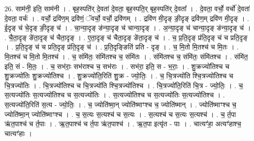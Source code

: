 \documentclass[17pt]{extarticle}
\begin{document}
26. साम॑नी॒ इति॒ साम॑नी । . बृह॒स्पति॑र् दे॒वता॑ दे॒वता॒ बृह॒स्पति॒र् बृह॒स्पति॑र् दे॒वता᳚ । . दे॒वता॒ वर्चो॒ वर्चो॑ दे॒वता॑ दे॒वता॒ वर्चः॑ । . वर्चो॒ द्रवि॑ण॒म् द्रवि॑णं॒ ॅवर्चो॒ वर्चो॒ द्रवि॑णम् । . द्रवि॑ण मी॒दृङ् ङी॒दृङ् द्रवि॑ण॒म् द्रवि॑ण मी॒दृङ् । . ई॒दृङ् च॑ चे॒दृङ् ङी॒दृङ् च॑ । . चा॒न्या॒दृङ् ङ॑न्या॒दृङ् च॑ चान्या॒दृङ् । . अ॒न्या॒दृङ् च॑ चान्या॒दृङ् ङ॑न्या॒दृङ् च॑ । . चै॒ता॒दृङ् ङे॑ता॒दृङ् च॑ चैता॒दृङ् । . ए॒ता॒दृङ् च॑ चैता॒दृङ् ङे॑ता॒दृङ् च॑ । . च॒ प्र॒ति॒दृङ् प्र॑ति॒दृङ् च॑ च प्रति॒दृङ् । . प्र॒ति॒दृङ् च॑ च प्रति॒दृङ् प्र॑ति॒दृङ् च॑ । . प्र॒ति॒दृङ्ङिति॑ प्रति - दृङ् । . च॒ मि॒तो मि॒तश्च॑ च मि॒तः । . मि॒तश्च॑ च मि॒तो मि॒तश्च॑ । . च॒ संमि॑तः॒ संमि॑तश्च च॒ संमि॑तः । . संमि॑तश्च च॒ संमि॑तः॒ संमि॑तश्च । . संमि॑त॒ इति॒ सं - मि॒तः॒ । . च॒ सभ॑राः॒ सभ॑राश्च च॒ सभ॑राः । . सभ॑रा॒ इति॒ स - भ॒राः॒ । . शु॒क्रज्यो॑तिश्च च शु॒क्रज्यो॑तिः शु॒क्रज्यो॑तिश्च । . शु॒क्रज्यो॑ति॒रिति॑ शु॒क्र - ज्यो॒तिः॒ । . च॒ चि॒त्रज्यो॑ति श्चि॒त्रज्यो॑तिश्च च चि॒त्रज्यो॑तिः । . चि॒त्रज्यो॑तिश्च च चि॒त्रज्यो॑ति श्चि॒त्रज्यो॑तिश्च । . चि॒त्रज्यो॑ति॒रिति॑ चि॒त्र - ज्यो॒तिः॒ । . च॒ स॒त्यज्यो॑तिः स॒त्यज्यो॑तिश्च च स॒त्यज्यो॑तिः । . स॒त्यज्यो॑तिश्च च स॒त्यज्यो॑तिः स॒त्यज्यो॑तिश्च । . स॒त्यज्यो॑ति॒रिति॑ स॒त्य - ज्यो॒तिः॒ । . च॒ ज्योति॑ष्मा॒न् ज्योति॑ष्माꣳश्च च॒ ज्योति॑ष्मान् । . ज्योति॑ष्माꣳश्च च॒ ज्योति॑ष्मा॒न् ज्योति॑ष्माꣳश्च । . च॒ स॒त्यः स॒त्यश्च॑ च स॒त्यः । . स॒त्यश्च॑ च स॒त्यः स॒त्यश्च॑ । . च॒ र्त॒पा ऋ॑त॒पाश्च॑ च र्त॒पाः । . ऋ॒त॒पाश्च॑ च र्त॒पा ऋ॑त॒पाश्च॑ । . ऋ॒त॒पा इत्यृ॑त - पाः । . चात्यꣳ॑हा॒ अत्यꣳ॑हाश्च॒ चात्यꣳ॑हाः । \newline
\end{document}
